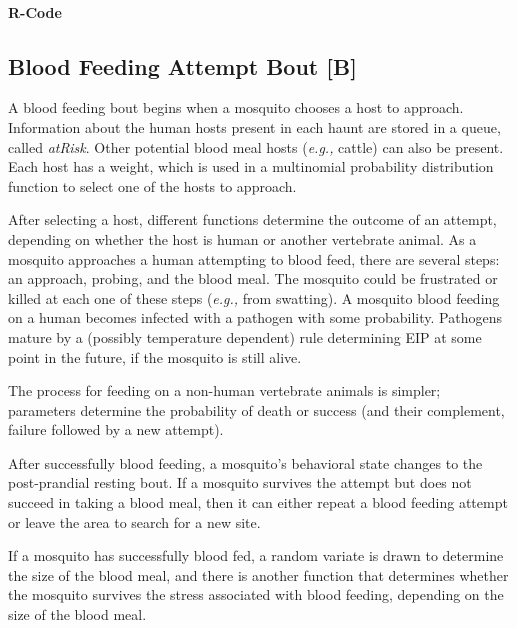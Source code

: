 \documentclass{article}
\newcommand{\eg}{{\em e.g., }}
\begin{document}
\paragraph{R-Code}


\begin{Schunk}
\end{Schunk}

\subsection{Blood Feeding Attempt Bout [B]}

A blood feeding bout begins when a mosquito chooses a host to
approach. Information about the human hosts present in each haunt
are stored in a queue, called {\em atRisk}. Other potential blood
meal hosts (\eg cattle) can also be present. Each host has a
weight, which is used in a multinomial probability distribution
function to select one of the hosts to approach.

After selecting a host, different functions determine the outcome
of an attempt, depending on whether the host is human or another
vertebrate animal. As a mosquito approaches a human attempting to
blood feed, there are several steps: an approach, probing, and
the blood meal. The mosquito could be frustrated or killed at
each one of these steps (\eg from swatting). A mosquito blood
feeding on a human becomes infected with a pathogen with some
probability. Pathogens mature by a (possibly temperature
dependent) rule determining EIP at some point in the future, if
the mosquito is still alive.

The process for feeding on a non-human vertebrate animals is
simpler; parameters determine the probability of death or success
(and their complement, failure followed by a new attempt).

After successfully blood feeding, a mosquito's behavioral state
changes to the post-prandial resting bout. If a mosquito survives
the attempt but does not succeed in taking a blood meal, then it
can either repeat a blood feeding attempt or leave the area to
search for a new site.

If a mosquito has successfully blood fed, a random variate is
drawn to determine the size of the blood meal, and there is
another function that determines whether the mosquito survives
the stress associated with blood feeding, depending on the size
of the blood meal.
\end{document}
